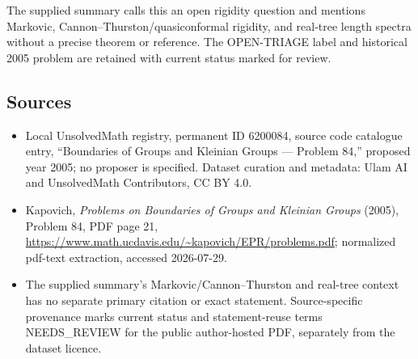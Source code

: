 \documentclass[11pt]{article}
\begin{document}
The supplied summary calls this an open rigidity question and mentions Markovic, Cannon--Thurston/quasiconformal rigidity, and real-tree length spectra without a precise theorem or reference. The OPEN-TRIAGE label and historical 2005 problem are retained with current status marked for review.
\subsection{Sources}
\begin{itemize}
\item Local UnsolvedMath registry, permanent ID 6200084, source code catalogue entry, ``Boundaries of Groups and Kleinian Groups --- Problem 84,'' proposed year 2005; no proposer is specified. Dataset curation and metadata: Ulam AI and UnsolvedMath Contributors, CC BY 4.0.
\item Kapovich, \emph{Problems on Boundaries of Groups and Kleinian Groups} (2005), Problem 84, PDF page 21, \url{https://www.math.ucdavis.edu/~kapovich/EPR/problems.pdf}; normalized pdf-text extraction, accessed 2026-07-29.
\item The supplied summary's Markovic/Cannon--Thurston and real-tree context has no separate primary citation or exact statement. Source-specific provenance marks current status and statement-reuse terms NEEDS\_REVIEW for the public author-hosted PDF, separately from the dataset licence.
\end{itemize}
\end{document}
